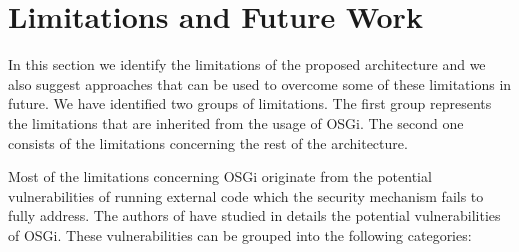 \section{Limitations and Future Work}
\label{sec:limitsPlugin}

In this section we identify the limitations of the proposed architecture and we also suggest approaches that can be used to overcome some of these limitations in future. We have identified two groups of limitations. The first group represents the limitations that are inherited from the usage of OSGi. The second one consists of the limitations concerning the rest of the architecture.

Most of the limitations concerning OSGi originate from the potential vulnerabilities of running external code which the security mechanism fails to fully address. The authors of \cite{parrend2009security} have studied in details the potential vulnerabilities of OSGi. These vulnerabilities can be grouped into the following categories:


